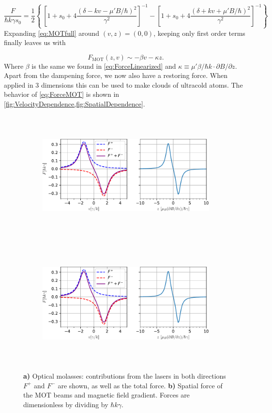 \begin{equation}\label{eq:MOTfull}
	\frac{F}{\hbar k \gamma s_0} = \frac{1}{2}\left\{\
	\left[1 + s_0 + 4\frac{(\delta - k v - \mu'B / \hbar)^2}{\gamma^2}\right]^{-1}-
	\left[1 + s_0 + 4\frac{(\delta + k v + \mu'B / \hbar)^2}{\gamma^2}\right]^{-1}
	\right\}     
\end{equation}                          
Expanding \cref{eq:MOTfull} around $(v,z) = (0,0)$, keeping only first order terms finally leaves us with \cite{Kowalski2010}

\begin{equation}\label{eq:ForceMOT}
	F_{\text{MOT}}(z,v) \sim -\beta v - \kappa z.
\end{equation}
Where $\beta$ is the same we found in \cref{eq:ForceLinearized} and $\kappa \equiv \mu' \beta /\hbar k \cdot \partial B/\partial z$. 
Apart from the dampening force, we now also have a restoring force. 
When applied in 3 dimensions this can be used to make clouds of ultracold atoms.
The behavior of \cref{eq:ForceMOT} is shown in \cref{fig:VelocityDependence,fig:SpatialDependence}.

\begin{figure}
\centering
	\begin{subfigure}{.49\textwidth}
		\centering
		\includegraphics[height=6.5cm]{figures/VelocityDependence.pdf}
		\caption{}
		\label{fig:VelocityDependence}
	\end{subfigure}
	\begin{subfigure}{.49\textwidth}
		\centering
		\includegraphics[height=6.5cm]{figures/SpatialDependence.pdf}
		\caption{}
		\label{fig:SpatialDependence}
	\end{subfigure}
	\caption{\textsf{\textbf{a)}} Optical molasses: contributions from the lasers in both directions $F^{+}$ and $F^{-}$ are shown, as well as the total force. \textbf{\textsf{b)}} Spatial force of the MOT beams and magnetic field gradient. Forces are dimensionless by dividing by $\hbar k \gamma$.}
\end{figure}

